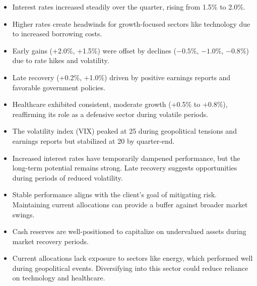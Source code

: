 \documentclass[11pt]{article}
\begin{document}
\begin{itemize}[leftmargin=1.5em, itemsep=2pt]
  \item Interest rates increased steadily over the quarter, rising from 1.5\%
  to 2.0\%.
  \item Higher rates create headwinds for growth-focused sectors like
  technology due to increased borrowing costs.
\end{itemize}
\begin{itemize}[leftmargin=1.5em, itemsep=2pt]
  \item Early gains (+2.0\%, +1.5\%) were offset by declines ($-0.5$\%,
  $-1.0$\%, $-0.8$\%) due to rate hikes and volatility.
  \item Late recovery (+0.2\%, +1.0\%) driven by positive earnings reports and
  favorable government policies.
\end{itemize}
\begin{itemize}[leftmargin=1.5em, itemsep=2pt]
  \item Healthcare exhibited consistent, moderate growth (+0.5\% to +0.8\%),
  reaffirming its role as a defensive sector during volatile periods.
\end{itemize}
\begin{itemize}[leftmargin=1.5em, itemsep=2pt]
  \item The volatility index (VIX) peaked at 25 during geopolitical tensions
  and earnings reports but stabilized at 20 by quarter-end.
\end{itemize}

\begin{itemize}[leftmargin=1.5em, itemsep=2pt]
  \item Increased interest rates have temporarily dampened performance, but
  the long-term potential remains strong. Late recovery suggests opportunities
  during periods of reduced volatility.
\end{itemize}
\begin{itemize}[leftmargin=1.5em, itemsep=2pt]
  \item Stable performance aligns with the client's goal of mitigating risk.
  Maintaining current allocations can provide a buffer against broader market
  swings.
\end{itemize}
\begin{itemize}[leftmargin=1.5em, itemsep=2pt]
  \item Cash reserves are well-positioned to capitalize on undervalued assets
  during market recovery periods.
\end{itemize}
\begin{itemize}[leftmargin=1.5em, itemsep=2pt]
  \item Current allocations lack exposure to sectors like energy, which
  performed well during geopolitical events. Diversifying into this sector
  could reduce reliance on technology and healthcare.
\end{itemize}
\end{document}
